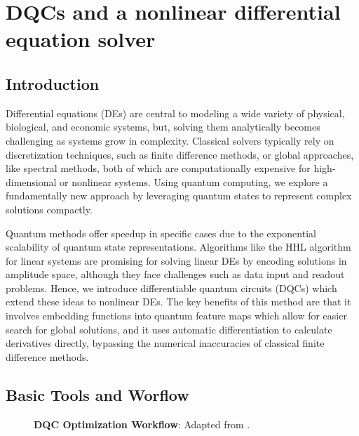 \documentclass[11pt,a4paper]{article}
\begin{document}
\section{DQCs and a nonlinear differential equation solver} \label{sec:DQC}

\subsection{Introduction}

Differential equations (DEs) are central to modeling a wide variety of physical, biological, and economic systems, but, solving them analytically becomes challenging as systems grow in complexity. Classical solvers typically rely on discretization techniques, such as finite difference methods, or global approaches, like spectral methods, both of which are computationally expensive for high-dimensional or nonlinear systems. Using quantum computing, we explore a fundamentally new approach by leveraging quantum states to represent complex solutions compactly.

Quantum methods offer speedup in specific cases due to the exponential scalability of quantum state representations. Algorithms like the HHL algorithm for linear systems are promising for solving linear DEs by encoding solutions in amplitude space, although they face challenges such as data input and readout problems. Hence, we introduce differentiable quantum circuits (DQCs) which extend these ideas to nonlinear DEs. The key benefits of this method are that it involves embedding functions into quantum feature maps which allow for easier search for global solutions, and it uses automatic differentiation to calculate derivatives directly, bypassing the numerical inaccuracies of classical finite difference methods.

\subsection{Basic Tools and Worflow}

\begin{figure}[H]
    \centering
    \caption{\textbf{DQC Optimization Workflow}: Adapted from \cite{DQC}.}
    \label{fig:dqc-optimization-workflow}
\end{figure}
\end{document}

